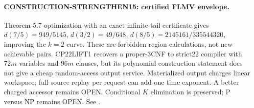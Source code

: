 \paragraph{CONSTRUCTION-STRENGTHEN15: certified FLMV envelope.}
Theorem 5.7 optimization with an exact infinite-tail certificate gives
$d(7/5)=949/5145$, $d(3/2)=49/648$,
$d(8/5)=2145161/335544320$, improving the $k=2$ curve.
These are forbidden-region calculations, not new achievable pairs.
CP22LIFT1 recovers a proper-3CNF to strict22 compiler with $72m$
variables and $96m$ clauses, but its polynomial construction statement
does not give a cheap random-access output service.
Materialized output charges linear workspace; full-source replay per
request can add one time exponent. A better charged accessor remains OPEN.
Conditional $K$ elimination is preserved; P versus NP remains OPEN.
See .
